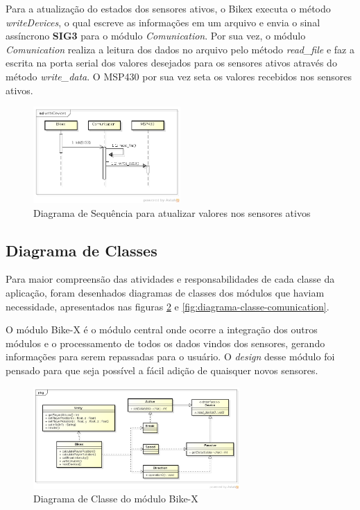 Para a atualização do estados dos sensores ativos, o Bikex executa o método \textit{writeDevices}, o qual escreve as informações em um arquivo e envia o sinal assíncrono \textbf{SIG3} para o módulo \textit{Comunication}. Por sua vez, o módulo \textit{Comunication} realiza a leitura dos dados no arquivo pelo método \textit{read\_file} e  faz a escrita na porta serial dos valores desejados para os sensores ativos através do método \textit{write\_data}. O MSP430 por sua vez seta os valores recebidos nos sensores ativos.

\begin{figure}[h]
  \centering
	\includegraphics[width=0.5\textwidth]{figuras/writeDevices}
  \caption{Diagrama de Sequência para atualizar valores nos sensores ativos}
  \label{fig:diagrama-sequencia-write-devices}
\end{figure}


\subsection{Diagrama de Classes} %
\label{sec:diagrama_de_classe}

Para maior compreensão das atividades e responsabilidades de cada classe da aplicação, foram desenhados %
diagramas de classes dos módulos que haviam necessidade, apresentados nas figuras \ref{fig:diagrama-classe-bikex} e \ref{fig:diagrama-classe-comunication}.

O módulo Bike-X é o módulo central onde ocorre a integração dos outros módulos e o processamento de todos os dados vindos dos sensores, gerando informações para serem repassadas para o usuário. O \textit{design} desse módulo foi pensado para que seja possível a fácil adição de quaisquer novos sensores.

\begin{figure}[h]
  \centering
	\includegraphics[width=0.7\textwidth]{figuras/Bikex}
  \caption{Diagrama de Classe do módulo Bike-X}
  \label{fig:diagrama-classe-bikex}
\end{figure}

